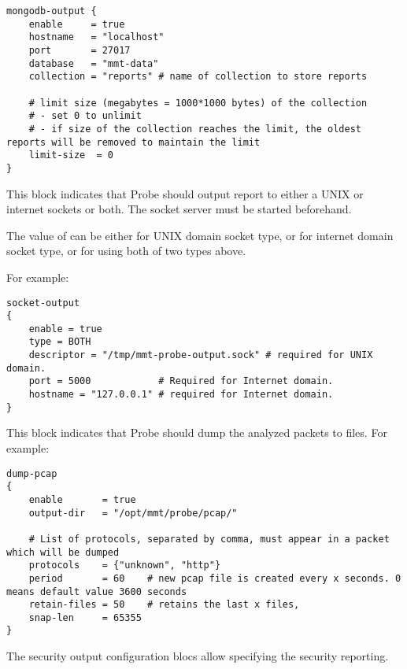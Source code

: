 \begin{lstlisting}[style=CONFIG]
mongodb-output {
    enable     = true
    hostname   = "localhost"
    port       = 27017
    database   = "mmt-data"
    collection = "reports" # name of collection to store reports

    # limit size (megabytes = 1000*1000 bytes) of the collection
    # - set 0 to unlimit
    # - if size of the collection reaches the limit, the oldest reports will be removed to maintain the limit
    limit-size  = 0
}
\end{lstlisting}

This block indicates that Probe should output report to either a UNIX or internet sockets or both.
The socket server must be started beforehand.

The value of  can be either  for UNIX domain socket type, or  for internet domain socket type, or  for using both of two types above.

For example:


\begin{lstlisting}[style=CONFIG]
socket-output
{
    enable = true
    type = BOTH
    descriptor = "/tmp/mmt-probe-output.sock" # required for UNIX domain.
    port = 5000            # Required for Internet domain.
    hostname = "127.0.0.1" # required for Internet domain.
}
\end{lstlisting}

This block indicates that Probe should dump the analyzed packets to files.
For example:


\begin{lstlisting}[style=CONFIG]
dump-pcap
{
    enable       = true
    output-dir   = "/opt/mmt/probe/pcap/"
    
    # List of protocols, separated by comma, must appear in a packet which will be dumped
    protocols    = {"unknown", "http"} 
    period       = 60    # new pcap file is created every x seconds. 0 means default value 3600 seconds
    retain-files = 50    # retains the last x files,
    snap-len     = 65355
}
\end{lstlisting}


The security output configuration blocs allow specifying the security reporting.

